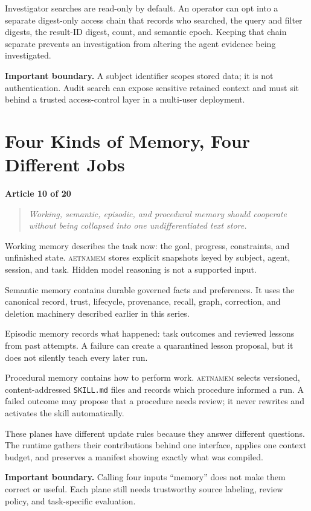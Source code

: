 \documentclass[11pt]{article}
\newcommand{\system}{\textsc{aetnamem}}
\newcommand{\articlelabel}[1]{%
  \noindent\colorbox{aetnaTeal!10}{%
    \parbox{0.96\textwidth}{\color{aetnaInk}\small\textbf{Article #1 of 20}}}%
  \par\medskip}
\newcommand{\coreidea}[1]{%
  \begin{quote}\color{aetnaTeal}\large\itshape #1\end{quote}}
\newcommand{\boundary}[1]{%
  \par\smallskip\noindent\textbf{Important boundary.} #1}
\begin{document}
Investigator searches are read-only by default. An operator can opt into a
separate digest-only access chain that records who searched, the query and
filter digests, the result-ID digest, count, and semantic epoch. Keeping that
chain separate prevents an investigation from altering the agent evidence
being investigated.

\boundary{A subject identifier scopes stored data; it is not authentication.
Audit search can expose sensitive retained context and must sit behind a
trusted access-control layer in a multi-user deployment.}

\clearpage
\section{Four Kinds of Memory, Four Different Jobs}
\articlelabel{10}
\coreidea{Working, semantic, episodic, and procedural memory should cooperate
without being collapsed into one undifferentiated text store.}

Working memory describes the task now: the goal, progress, constraints, and
unfinished state. \system{} stores explicit snapshots keyed by subject,
agent, session, and task. Hidden model reasoning is not a supported input.

Semantic memory contains durable governed facts and preferences. It uses the
canonical record, trust, lifecycle, provenance, recall, graph, correction, and
deletion machinery described earlier in this series.

Episodic memory records what happened: task outcomes and reviewed lessons from
past attempts. A failure can create a quarantined lesson proposal, but it does
not silently teach every later run.

Procedural memory contains how to perform work. \system{} selects versioned,
content-addressed \texttt{SKILL.md} files and records which procedure informed
a run. A failed outcome may propose that a procedure needs review; it never
rewrites and activates the skill automatically.

These planes have different update rules because they answer different
questions. The runtime gathers their contributions behind one interface,
applies one context budget, and preserves a manifest showing exactly what was
compiled.

\boundary{Calling four inputs ``memory'' does not make them correct or useful.
Each plane still needs trustworthy source labeling, review policy, and
task-specific evaluation.}

\clearpage
\end{document}
